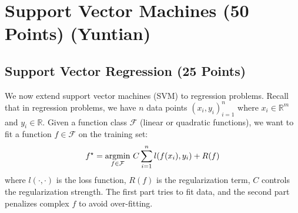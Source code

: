 \section{Support Vector Machines (50 Points) (Yuntian)}
\subsection{Support Vector Regression (25 Points)}
We now extend support vector machines (SVM) to regression problems. Recall that in regression problems, we have $n$ data points $(x_i,y_i)_{i=1}^n$ where $x_i\in \mathbb{R}^m$ and $y_i\in \mathbb{R}$. Given a function class $\mathcal{F}$ (\eg linear or quadratic functions), we want to fit a function $f\in\mathcal{F}$ on the training set:
\begin{align}
f^\star = \operatorname*{argmin}_{f\in\mathcal{F}}\, C\sum_{i=1}^n l(f(x_i),y_i) + R(f)
\end{align}
where $l(\cdot, \cdot)$ is the loss function, $R(f)$ is the regularization term, $C$ controls the regularization strength. The first part tries to fit data, and the second part penalizes complex $f$ to avoid over-fitting.


